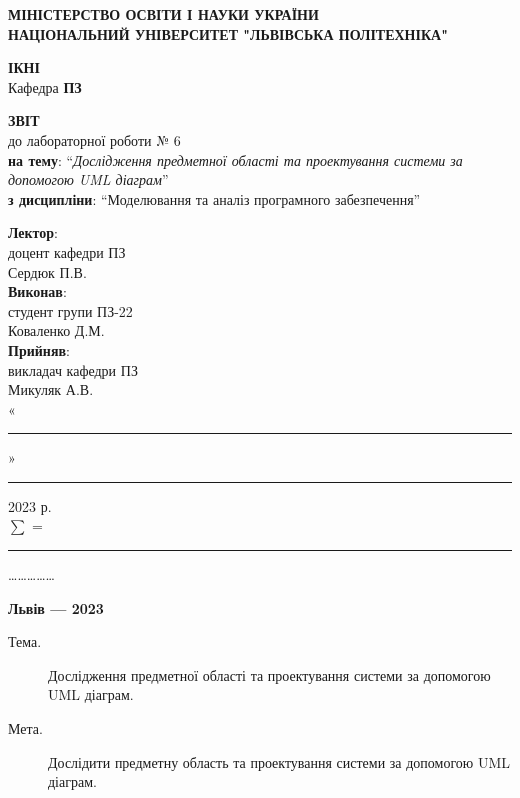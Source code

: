 \documentclass[oneside,14pt]{extarticle}
\newcommand\subject{Моделювання та аналіз програмного забезпечення}
\newcommand\lecturer{доцент кафедри ПЗ \\ Сердюк П.В.}
\newcommand\teacher{викладач кафедри ПЗ \\ Микуляк А.В.}
\newcommand\mygroup{ПЗ-22}
\newcommand\lab{6}
\newcommand\theme{Дослідження предметної області та
	проектування системи за допомогою UML діаграм}
\newcommand\purpose{Дослідити предметну область та
	проектування системи за допомогою UML діаграм}
\begin{document}
\begin{normalsize}
	\begin{titlepage}
		\thispagestyle{empty}
		\begin{center}
			\textbf{МІНІСТЕРСТВО ОСВІТИ І НАУКИ УКРАЇНИ\\
				НАЦІОНАЛЬНИЙ УНІВЕРСИТЕТ "ЛЬВІВСЬКА ПОЛІТЕХНІКА"}
		\end{center}
		\begin{flushright}
			\textbf{ІКНІ}\\
			Кафедра \textbf{ПЗ}
		\end{flushright}
		\vspace{70pt}
		\begin{center}
			\textbf{ЗВІТ}\\
			до лабораторної роботи № \lab\\
			\textbf{на тему}: “\textit{\theme}”\\
			\textbf{з дисципліни}: “\subject”
		\end{center}
		\vspace{50pt}
		\begin{flushright}
			
			\textbf{Лектор}:\\
			\lecturer\\
			\vspace{10pt}
			\textbf{Виконав}:\\
			
			студент групи \mygroup\\
			Коваленко Д.М.\\
			\vspace{10pt}
			\textbf{Прийняв}:\\
			
			\teacher\\
			
			\vspace{28pt}
			«\rule{1cm}{0.15mm}» \rule{1.5cm}{0.15mm} 2023 р.\\
			$\sum$ = \rule{1cm}{0.15mm}……………\\
			
		\end{flushright}
		\vspace{\fill}
		\begin{center}
			\textbf{Львів — 2023}
		\end{center}
	\end{titlepage}
		
	\begin{description}
		\item[Тема.] \theme.
		\item[Мета.] \purpose.
	\end{description}


\end{normalsize}
\end{document}
